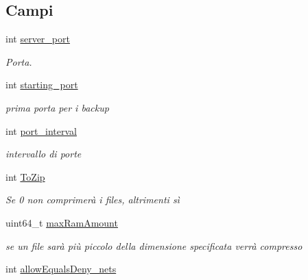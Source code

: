 \subsection*{Campi}
\begin{DoxyCompactItemize}
\item 
int \hyperlink{structconf_aed28b971a9300be1236bcb25339ac4d0}{server\+\_\+port}\hypertarget{structconf_aed28b971a9300be1236bcb25339ac4d0}{}\label{structconf_aed28b971a9300be1236bcb25339ac4d0}

\begin{DoxyCompactList}\small\item\em Porta. \end{DoxyCompactList}\item 
int \hyperlink{structconf_ae224d1fc60f5ebff720813b981605090}{starting\+\_\+port}\hypertarget{structconf_ae224d1fc60f5ebff720813b981605090}{}\label{structconf_ae224d1fc60f5ebff720813b981605090}

\begin{DoxyCompactList}\small\item\em prima porta per i backup \end{DoxyCompactList}\item 
int \hyperlink{structconf_a0d988cd9a9e701b9f9c495f4ad7efabc}{port\+\_\+interval}\hypertarget{structconf_a0d988cd9a9e701b9f9c495f4ad7efabc}{}\label{structconf_a0d988cd9a9e701b9f9c495f4ad7efabc}

\begin{DoxyCompactList}\small\item\em intervallo di porte \end{DoxyCompactList}\item 
int \hyperlink{structconf_ac9533944c1cffeede9fa067bd962cde0}{To\+Zip}\hypertarget{structconf_ac9533944c1cffeede9fa067bd962cde0}{}\label{structconf_ac9533944c1cffeede9fa067bd962cde0}

\begin{DoxyCompactList}\small\item\em Se 0 non comprimerà i files, altrimenti sì \end{DoxyCompactList}\item 
uint64\+\_\+t \hyperlink{structconf_a66f027d14ec97608e7d4f902c0e1a2ef}{max\+Ram\+Amount}\hypertarget{structconf_a66f027d14ec97608e7d4f902c0e1a2ef}{}\label{structconf_a66f027d14ec97608e7d4f902c0e1a2ef}

\begin{DoxyCompactList}\small\item\em se un file sarà più piccolo della dimensione specificata verrà compresso \end{DoxyCompactList}\item 
int \hyperlink{structconf_af8e49667319b5c643337dfd47794245f}{allow\+Equals\+Deny\+\_\+nets}\hypertarget{structconf_af8e49667319b5c643337dfd47794245f}{}\label{structconf_af8e49667319b5c643337dfd47794245f}


\end{DoxyCompactItemize}
